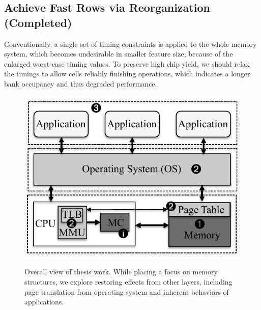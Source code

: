 

\subsection{Achieve Fast Rows via Reorganization (Completed)}
Conventionally, a single set of timing constraints is applied to the whole memory system, which becomes undesirable in smaller feature size, because of the enlarged worst-case timing values. To preserve high chip yield, we should relax the timings to allow cells reliably finishing operations, which indicates a longer bank occupancy and thus degraded performance.


\begin{figure}
 \centering
    	\includegraphics[width=0.4\linewidth]{figures/thesis_work.pdf}\\
  \vspace{-0.15in}
  \caption{Overall view of thesis work. While placing a focus on memory structures, we explore restoring effects from other layers, including page translation from operating system and inherent behaviors of applications.}
  \label{fig:thesis_work}
  \vspace{-0.45in}
\end{figure}

